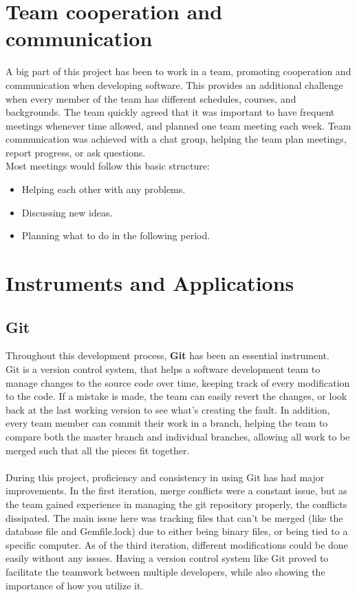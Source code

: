 	\section{Team cooperation and communication}
	\vspace{-5mm}
	A big part of this project has been to work in a team, promoting cooperation and communication when developing software. This provides an additional challenge when every member of the team has different schedules, courses, and backgrounds. The team quickly agreed that it was important to have frequent meetings whenever time allowed, and planned one team meeting each week. Team communication was achieved with a chat group, helping the team plan meetings, report progress, or ask questions.\\
	Most meetings would follow this basic structure:
	\vspace{-5mm}
	\begin{itemize}
		\setlength{\itemsep}{-5pt}
		\item Helping each other with any problems.
		\item Discussing new ideas.
		\item Planning what to do in the following period.
	\end{itemize} 
	
	
	
	
	\section{Instruments and Applications}
	\vspace{-5mm}
	\subsection{Git}
	\vspace{-5mm}
	Throughout this development process, \textbf{Git} has been an essential instrument.\\
	Git is a version control system, that helps a software development team to manage changes to the source code over time, keeping track of every modification to the code. If a mistake is made, the team can easily revert the changes, or look back at the last working version to see what's creating the fault. In addition, every team member can commit their work in a branch, helping the team to compare both the master branch and individual branches, allowing all work to be merged such that all the pieces fit together.\cite{versionController}\\\\
	During this project, proficiency and consistency in using Git has had major improvements. In the first iteration, merge conflicts were a constant issue, but as the team gained experience in managing the git repository properly, the conflicts dissipated. The main issue here was tracking files that can't be merged (like the database file and Gemfile.lock) due to either being binary files, or being tied to a specific computer. As of the third iteration, different modifications could be done easily without any issues. Having a version control system like Git proved to facilitate the teamwork between multiple developers, while also showing the importance of how you utilize it. 
	
